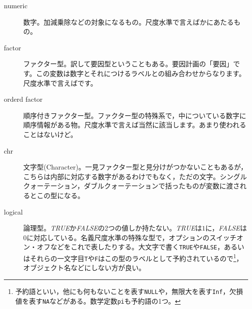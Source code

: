 \begin{description}
	\item[numeric] 数字。加減乗除などの対象になるもの。尺度水準で言えばかにあたるもの。
	\item[factor] ファクター型。訳して要因型ということもある。要因計画の「要因」です。この変数は数字とそれにつけるラベルとの組み合わせからなります。尺度水準で言えばです。
	\item[orderd factor] 順序付きファクター型。ファクター型の特殊系で，中についている数字に順序情報がある物。尺度水準で言えば当然に該当します。あまり使われることはないけど。
	\item[chr] 文字型(Character)。一見ファクター型と見分けがつかないこともあるが，こちらは内部に対応する数字があるわけでもなく，ただの文字。シングルクォーテーション，ダブルクォーテーションで括ったものが変数に渡されるとこの型になる。
	\item[logical] 論理型。\textit{TRUE}か\textit{FALSE}の2つの値しか持たない。\textit{TRUE}は$1$に，\textit{FALSE}は$0$に対応している。名義尺度水準の特殊な型で，オプションのスイッチオン・オフなどをこれで表したりする。大文字で書く\texttt{TRUE}や\texttt{FALSE}，あるいはそれらの一文字目\texttt{T}や\texttt{F}はこの型のラベルとして予約されているので\footnote{予約語といい，他にも何もないことを表す\texttt{NULL}や，無限大を表す\texttt{Inf}，欠損値を表す\texttt{NA}などがある。数学定数\texttt{pi}も予約語の1つ。}，オブジェクト名などにしない方が良い。
\end{description}
